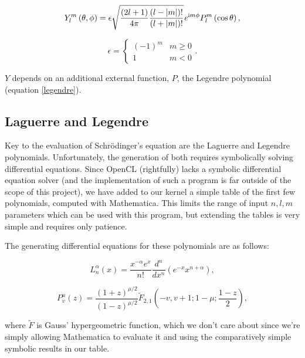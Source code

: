 \documentclass{acmsiggraph}
\begin{document}
\begin{equation}\label{yFunc}
Y_l^m\left(\theta,\phi\right)=\epsilon
\sqrt{\frac{\left(2l+1\right)}{4\pi}
    \frac{\left(l-\left|m\right|\right)!}{\left(l+\left|m\right|\right)!}}
\mathit{e}^{{\rm i}m\phi}
P^m_l\left(\cos\theta\right),
\end{equation}

\begin{equation}\label{yEpsilon}
\epsilon=\begin{cases}
\left(-1\right)^m & \text{$m\ge0$} \\
1 & \text{$m<0$}
\end{cases}.
\end{equation}

$Y$ depends on an additional external function, $P$, the Legendre polynomial (equation \ref{legendre}).

\subsection{Laguerre and Legendre}

\label{laguerreLegendre}

Key to the evaluation of Schr\"{o}dinger's equation are the Laguerre and Legendre polynomials. Unfortunately, the generation of both requires symbolically solving differential equations. \cite{legendreCite} Since OpenCL (rightfully) lacks a symbolic differential equation solver (and the implementation of such a program is far outside of the scope of this project), we have added to our kernel a simple table of the first few polynomials, computed with Mathematica. This limits the range of input $n, l, m$ parameters which can be used with this program, but extending the tables is very simple and requires only patience.

The generating differential equations for these polynomials are as follows:

\begin{equation}\label{laguerre}
L^\alpha_n\left(x\right)=\frac{x^{-\alpha}e^x}{n!}\frac{d^n}{dx^n}\left(e^{-x}x^{n+\alpha}\right),
\end{equation}

\begin{equation}\label{legendre}
P^u_v\left(z\right)=\frac{\left(1+z\right)^{\mu/2}}{\left(1-z\right)^{\mu/2}}
\tilde{F}_{2,1}
\left(-v,v+1;1-\mu;\frac{1-z}{2}\right),
\end{equation}

where $\tilde{F}$ is Gauss' hypergeometric function, which we don't care about since we're simply allowing Mathematica to evaluate it and using the comparatively simple symbolic results in our table.
\end{document}

